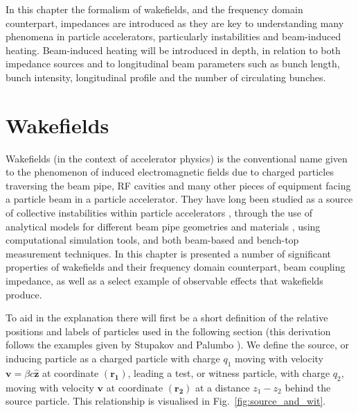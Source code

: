 In this chapter the formalism of wakefields, and the frequency domain counterpart, impedances are introduced as they are key to understanding many phenomena in particle accelerators, particularly instabilities and beam-induced heating. Beam-induced heating will be introduced in depth, in relation to both impedance sources and to longitudinal beam parameters such as bunch length, bunch intensity, longitudinal profile and the number of circulating bunches.

\section{Wakefields}

Wakefields (in the context of accelerator physics) is the conventional name given to the phenomenon of induced electromagnetic fields due to charged particles traversing the beam pipe, RF cavities and many other pieces of equipment facing a particle beam in a particle accelerator. They have long been studied as a source of collective instabilities within particle accelerators \cite{Laslett:ResWallInstab}, through the use of analytical models for different beam pipe geometries \cite{Stupakov:wakeandImpedance, Stupakov:surfaceRough, Stupakov:adInImpTheory} and materials \cite{Mounet:PhDThesis}, using computational simulation tools, and both beam-based and bench-top measurement techniques. In this chapter is presented a number of significant properties of wakefields and their frequency domain counterpart, beam coupling impedance, as well as a select example of observable effects that wakefields produce.

To aid in the explanation there will first be a short definition of the relative positions and labels of particles used in the following section (this derivation follows the examples given by Stupakov \cite{Stupakov:wakeandImpedance} and Palumbo \cite{Palumbo:Wakes}). We define the source, or inducing particle as a charged particle with charge $q_{1}$ moving with velocity $\mathbf{v} = \beta{}c \mathbf{\hat{z}}$ at coordinate $\left( \mathbf{r_{1}} \right)$, leading a test, or witness particle, with charge $q_{2}$, moving with velocity $\mathbf{v}$ at coordinate $\left( \mathbf{r_{2}} \right)$ at a distance $z_{1} - z_{2}$ behind the source particle. This relationship is visualised in Fig.~\ref{fig:source_and_wit}.


